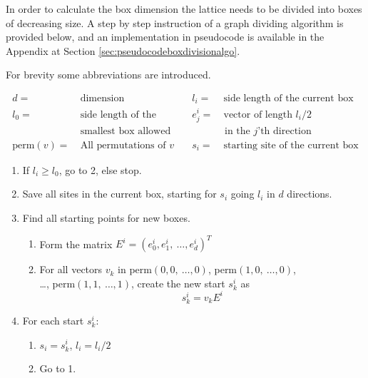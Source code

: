 
In order to calculate the box dimension the lattice needs to be divided into boxes of decreasing size. A step by step instruction of a graph dividing algorithm is provided below, and an implementation in pseudocode is available in the Appendix at Section \ref{sec:pseudocodeboxdivisionalgo}.

For brevity some abbreviations are introduced.

\begin{equation*}
    \begin{aligned}
        d =& \ \text{dimension} &\quad l_i =& \ \text{side length of the current box}\\
%
        l_0 =& \ \text{side length of the} &\quad e_j^i =& \ \text{vector of length } l_i / 2 \\
%
             & \ \text{smallest box allowed} & & \text{ in the }j\text{'th direction} \\
%
        \text{perm}(v) =& \ \text{All permutations of } v &\quad s_i =& \ \text{starting site of the current box}
    \end{aligned}
\end{equation*}

\begin{enumerate}
    \item If $l_i \geq l_0$, go to 2, else stop.
%
    \item Save all sites in the current box, starting for $s_i$ going $l_i$ in $d$ directions.
%
    \item Find all starting points for new boxes.
%
    \begin{enumerate}[label=(\roman*)]
%
        \item Form the matrix $E^i = (e_0^i, e_1^i, \  \ldots, e_d^i)^T$
%
        \item For all vectors $v_k$ in perm$(0, 0, \ \ldots , 0)$, perm$(1, 0, \ \ldots , 0)$, \\ \ldots, perm$(1, 1, \ \ldots , 1)$, create the new start $s^i_k$ as $$s^i_k = v_k E^i$$
%
    \end{enumerate}
%
    \item For each start $s_k^i$:
    \begin{enumerate}[label=(\roman*)]
        \item $s_i = s^i_k$, $l_i = l_i / 2$
        \item Go to 1.
    \end{enumerate}
%
\end{enumerate}

